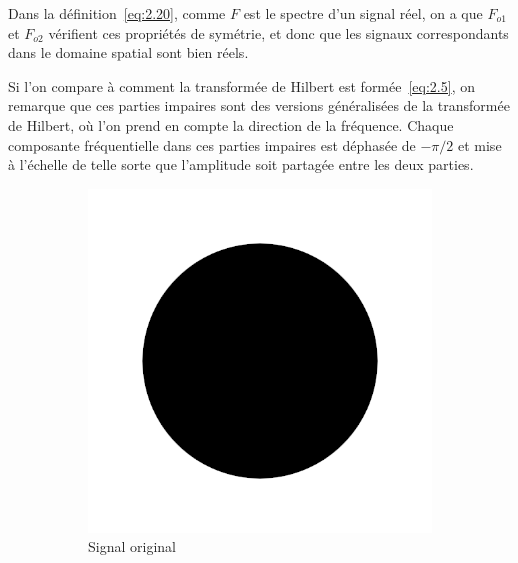 Dans la définition~\ref{eq:2.20}, comme $F$ est le spectre d'un signal réel, on a que $F_{o1}$ et $F_{o2}$ vérifient ces propriétés de symétrie, et donc que les signaux correspondants dans le domaine spatial sont bien réels.

\bigskip

Si l'on compare à comment la transformée de Hilbert est formée~\ref{eq:2.5}, on remarque que ces parties impaires sont des versions généralisées de la transformée de Hilbert, où l'on prend en compte la direction de la fréquence. Chaque composante fréquentielle dans ces parties impaires est déphasée de $-\pi/2$ et mise à l'échelle de telle sorte que l'amplitude soit partagée entre les deux parties.

\bigskip

\begin{figure}
    \centering
    \begin{subfigure}[b]{.3\textwidth}
        \includegraphics[width=\textwidth]{contenu/resources/images/disk}
        \caption{Signal original}
    \end{subfigure}
    \hfill
    \begin{subfigure}[b]{.3\textwidth}

\end{subfigure}
\end{figure}
